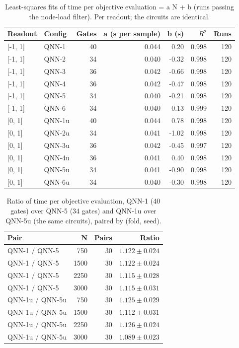 \begin{table}[htbp]
\centering
\small
\caption{Least-squares fits of time per objective evaluation = a N + b (runs passing the node-load filter). Per readout; the circuits are identical.}
\label{tab:t5a}
\begin{tabular}{llrrrrr}
\toprule
Readout & Config & Gates & a (s per sample) & b (s) & $R^2$ & Runs \\
\midrule
{[-1, 1]} & QNN-1 & 40 & 0.044 & 0.20 & 0.998 & 120 \\
{[-1, 1]} & QNN-2 & 34 & 0.040 & -0.32 & 0.998 & 120 \\
{[-1, 1]} & QNN-3 & 36 & 0.042 & -0.66 & 0.998 & 120 \\
{[-1, 1]} & QNN-4 & 36 & 0.042 & -0.47 & 0.998 & 120 \\
{[-1, 1]} & QNN-5 & 34 & 0.040 & -0.21 & 0.998 & 120 \\
{[-1, 1]} & QNN-6 & 34 & 0.040 & 0.13 & 0.999 & 120 \\
\midrule
{[0, 1]} & QNN-1u & 40 & 0.044 & 0.78 & 0.998 & 120 \\
{[0, 1]} & QNN-2u & 34 & 0.041 & -1.02 & 0.998 & 120 \\
{[0, 1]} & QNN-3u & 36 & 0.042 & -0.45 & 0.997 & 120 \\
{[0, 1]} & QNN-4u & 36 & 0.041 & 0.40 & 0.998 & 120 \\
{[0, 1]} & QNN-5u & 34 & 0.041 & -0.90 & 0.998 & 120 \\
{[0, 1]} & QNN-6u & 34 & 0.040 & -0.30 & 0.998 & 120 \\
\bottomrule
\end{tabular}
\end{table}

\begin{table}[htbp]
\centering
\small
\caption{Ratio of time per objective evaluation, QNN-1 (40 gates) over QNN-5 (34 gates) and QNN-1u over QNN-5u (the same circuits), paired by (fold, seed).}
\label{tab:t5b}
\begin{tabular}{lrrr}
\toprule
Pair & N & Pairs & Ratio \\
\midrule
QNN-1 / QNN-5 & 750 & 30 & $1.122 \pm 0.024$ \\
QNN-1 / QNN-5 & 1500 & 30 & $1.122 \pm 0.024$ \\
QNN-1 / QNN-5 & 2250 & 30 & $1.115 \pm 0.028$ \\
QNN-1 / QNN-5 & 3000 & 30 & $1.115 \pm 0.031$ \\
\midrule
QNN-1u / QNN-5u & 750 & 30 & $1.125 \pm 0.029$ \\
QNN-1u / QNN-5u & 1500 & 30 & $1.112 \pm 0.031$ \\
QNN-1u / QNN-5u & 2250 & 30 & $1.126 \pm 0.024$ \\
QNN-1u / QNN-5u & 3000 & 30 & $1.089 \pm 0.023$ \\
\bottomrule
\end{tabular}
\end{table}


